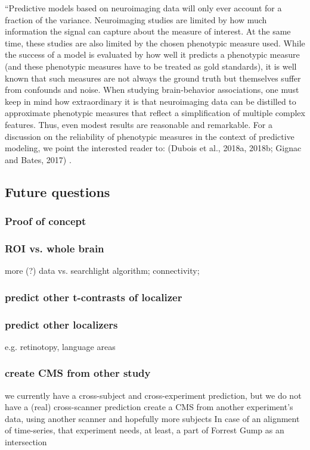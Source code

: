 ``Predictive models based on neuroimaging data will only ever account for a
fraction of the variance.
%
Neuroimaging studies are limited by how much information the signal can capture
about the measure of interest.
%
At the same time, these studies are also limited by the chosen phenotypic
measure used.  While the success of a model is evaluated by how well it predicts
a phenotypic measure (and these phenotypic measures have to be treated as gold
standards), it is well known that such measures are not always the ground truth
but themselves suffer from confounds and noise.
%
When studying brain-behavior associations, one must keep in mind how
extraordinary it is that neuroimaging data can be distilled to approximate
phenotypic measures that reﬂect a simpliﬁcation of multiple complex features.
%
Thus, even modest results are reasonable and remarkable.
%
For a discussion on the reliability of phenotypic measures in the context of
predictive modeling, we point the interested reader to: (Dubois et al., 2018a,
2018b; Gignac and Bates, 2017) \citep{scheinost2019ten}.

\subsection{Future questions}
%

\subsubsection{Proof of concept}
%


\subsubsection{ROI vs. whole brain}
%
more (?) data vs. searchlight algorithm; connectivity;
\citep{nastase2019leveraging}


\subsubsection{predict other t-contrasts of localizer}


\subsubsection{predict other localizers}
%
e.g. retinotopy, language areas


\subsubsection{create CMS from other study}
%
we currently have a cross-subject and cross-experiment prediction,
but we do not have a (real) cross-scanner prediction
%
create a CMS from another experiment’s data,
using another scanner and hopefully more subjects
%
In case of an alignment of time-series,
that experiment needs, at least, a part of Forrest Gump as an intersection


